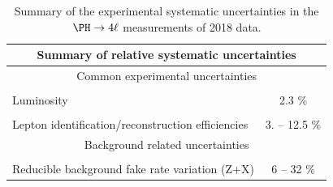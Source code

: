 \begin{table}[!htb]
	\begin{center}
		\small
		\caption{
			Summary of the experimental systematic uncertainties in the $\Hllll$ measurements of 2018 data. %
			\label{tab:SystOverviewC}
		}
		\begin{tabular}{|lc|} 
			\hline %
			\hline %
			\multicolumn{2}{|c|}{\textbf{Summary of relative systematic uncertainties}} \\
			\hline %
			\hline %
			\multicolumn{2}{|c|}{Common experimental uncertainties} \\
			\hline %
			\vspace{-0.4cm} & \\
			Luminosity & 2.3 \%  \\ 
			\vspace{-0.4cm} & \\
			Lepton identification/reconstruction efficiencies & 3. -- 12.5 \% \\ 
			\hline %
			\hline %
			\multicolumn{2}{|c|}{Background related uncertainties} \\
			\hline %
			\vspace{-0.4cm} & \\
			Reducible background fake rate variation (Z+X) & 6 -- 32 \% \\ 
			\hline %

\end{tabular}
\end{center}
\end{table}
